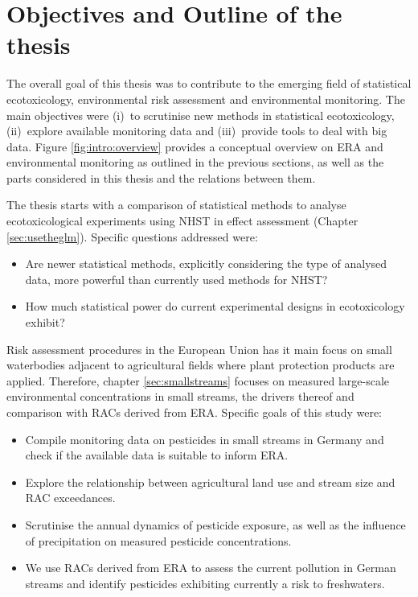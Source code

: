 \section{Objectives and Outline of the thesis}

The overall goal of this thesis was to contribute to the emerging field of statistical ecotoxicology, environmental risk assessment and environmental monitoring.
The main objectives were (i)~to scrutinise new methods in statistical ecotoxicology,
(ii)~explore available monitoring data and
(iii)~provide tools to deal with big data.
Figure \ref{fig:intro:overview} provides a conceptual overview on ERA and environmental monitoring as outlined in the previous sections, as well as the parts considered in this thesis and the relations between them. 

\noindent The thesis starts with a comparison of statistical methods to analyse ecotoxicological experiments using NHST in effect assessment (Chapter \ref{sec:usetheglm}). 
Specific questions addressed were:

\begin{itemize}
	\item Are newer statistical methods, explicitly considering the type of analysed data, more powerful than currently used methods for NHST?
	\item How much statistical power do current experimental designs in ecotoxicology exhibit?
\end{itemize}


\noindent Risk assessment procedures in the European Union has it main focus on small waterbodies adjacent to agricultural fields where plant protection products are applied.
Therefore, chapter \ref{sec:smallstreams} focuses on measured large-scale environmental concentrations in small streams, the drivers thereof and comparison with RACs derived from ERA.
Specific goals of this study were:
\begin{itemize}
	\item Compile monitoring data on pesticides in small streams in Germany and check if the available data is suitable to inform ERA.
	\item Explore the relationship between agricultural land use and stream size and RAC exceedances.
	\item Scrutinise the annual dynamics of pesticide exposure, as well as the influence of precipitation on measured pesticide concentrations.
	\item We use RACs derived from ERA to assess the current pollution in German streams and identify pesticides exhibiting currently a risk to freshwaters.
\end{itemize}

